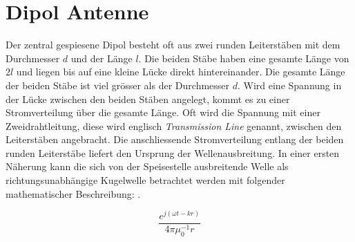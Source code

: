 
\section{Dipol Antenne}\label{sec:DipolAntenne}
Der zentral gespiesene Dipol besteht oft aus zwei runden Leiterstäben mit dem Durchmesser $d$ und der Länge $l$. Die beiden Stäbe haben eine gesamte Länge von $2l$ und liegen bis auf eine kleine Lücke direkt hintereinander. Die gesamte Länge der beiden Stäbe ist viel grösser als der Durchmesser $d$. Wird eine Spannung in der Lücke zwischen den beiden Stäben angelegt, kommt es zu einer Stromverteilung über die gesamte Länge. Oft wird die Spannung mit einer Zweidrahtleitung,  diese wird englisch \textit{Transmission Line} genannt, zwischen den Leiterstäben angebracht. Die anschliessende Stromverteilung entlang der beiden runden Leiterstäbe liefert den Ursprung der Wellenausbreitung. In einer ersten Näherung kann die sich von der Speisestelle ausbreitende Welle als richtungsunabhängige Kugelwelle betrachtet werden mit folgender mathematischer Beschreibung: \cite{elliott1981antenna}.

\begin{equation}\label{term:Kugelwelle}
\frac{e^{j(\omega t-kr)}}{4\pi \mu_{0}^{-1}r}
\end{equation}

